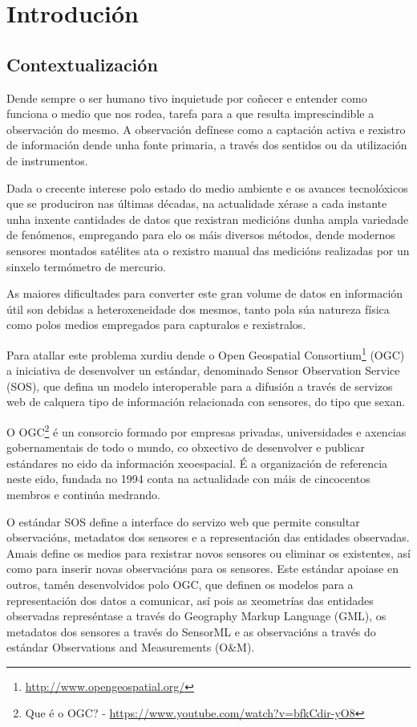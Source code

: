 \chapter{Introdución}
\section{Contextualización}
Dende sempre o ser humano tivo inquietude por coñecer e entender como funciona o medio que nos rodea, tarefa para a que resulta imprescindible a observación do mesmo. A observación defínese como a captación activa e rexistro de información dende unha fonte primaria, a través dos sentidos ou da utilización de instrumentos.

Dada o crecente interese polo estado do medio ambiente e os avances tecnolóxicos que se produciron nas últimas décadas, na actualidade xérase a cada instante unha inxente cantidades de datos que rexistran medicións dunha ampla variedade de fenómenos, empregando para elo os máis diversos métodos, dende modernos sensores montados satélites ata o rexistro manual das medicións realizadas por un sinxelo termómetro de mercurio.

As maiores dificultades para converter este gran volume de datos en información útil son debidas a heteroxeneidade dos mesmos, tanto pola súa natureza física como polos medios empregados para capturalos e rexistralos.

Para atallar este problema xurdiu dende o Open Geospatial Consortium\footnote{\url{http://www.opengeospatial.org/}} (OGC) a iniciativa de desenvolver un estándar, denominado Sensor Observation Service (SOS), que defina un modelo interoperable para a difusión a través de servizos web de calquera tipo de información relacionada con sensores, do tipo que sexan.

O OGC\footnote{Que é o OGC? - \url{https://www.youtube.com/watch?v=bfkCdir-yO8}} é un consorcio formado por empresas privadas, universidades e axencias gobernamentais de todo o mundo, co obxectivo de desenvolver e publicar estándares no eido da información xeoespacial. É a organización de referencia neste eido, fundada no 1994 conta na actualidade con máis de cincocentos membros e continúa medrando.

O estándar SOS define a interface do servizo web que permite consultar observacións, metadatos dos sensores e a representación das entidades observadas. Amais define os medios para rexistrar novos sensores ou eliminar os existentes, así como para inserir novas observacións para os sensores. Este estándar apoiase en outros, tamén desenvolvidos polo OGC, que definen os modelos para a representación dos datos a comunicar, así pois as xeometrías das entidades observadas represéntase a través do Geography Markup Language (GML), os metadatos dos sensores a través do SensorML e as observacións a través do estándar Observations and Measurements (O\&M).

